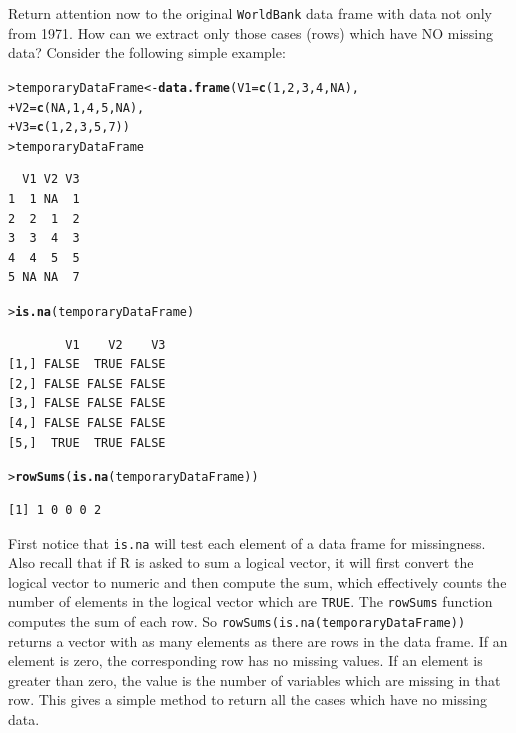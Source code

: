 \documentclass[12pt,oneside]{book}\usepackage[]{graphicx}\usepackage[]{color}
\makeatletter
\newcommand{\hlnum}[1]{\textcolor[rgb]{0.686,0.059,0.569}{#1}}%
\newcommand{\hlstd}[1]{\textcolor[rgb]{0.345,0.345,0.345}{#1}}%
\newcommand{\hlkwb}[1]{\textcolor[rgb]{0.69,0.353,0.396}{#1}}%
\newcommand{\hlkwc}[1]{\textcolor[rgb]{0.333,0.667,0.333}{#1}}%
\newcommand{\hlkwd}[1]{\textcolor[rgb]{0.737,0.353,0.396}{\textbf{#1}}}%
\newenvironment{kframe}{%
 \def\at@end@of@kframe{}%
 \ifinner\ifhmode%
  \def\at@end@of@kframe{\end{minipage}}%
  \begin{minipage}{\columnwidth}%
 \fi\fi%
 \def\FrameCommand##1{\hskip\@totalleftmargin \hskip-\fboxsep
 \colorbox{shadecolor}{##1}\hskip-\fboxsep
     \hskip-\linewidth \hskip-\@totalleftmargin \hskip\columnwidth}%
 \MakeFramed {\advance\hsize-\width
   \@totalleftmargin\z@ \linewidth\hsize
   \@setminipage}}%
 {\par\unskip\endMakeFramed%
 \at@end@of@kframe}
\newenvironment{knitrout}{}{} %
\makeatother
\begin{document}
Return attention now to the original \verb+WorldBank+ data frame with data not only from 1971. How can we extract only those cases (rows) which have NO missing data?  Consider the following simple example:
\begin{knitrout}
\color{fgcolor}\begin{kframe}
\begin{alltt}
\hlstd{> }\hlstd{temporaryDataFrame} \hlkwb{<-} \hlkwd{data.frame}\hlstd{(}\hlkwc{V1} \hlstd{=} \hlkwd{c}\hlstd{(}\hlnum{1}\hlstd{,} \hlnum{2}\hlstd{,} \hlnum{3}\hlstd{,} \hlnum{4}\hlstd{,} \hlnum{NA}\hlstd{),}
\hlstd{+ }                                 \hlkwc{V2} \hlstd{=} \hlkwd{c}\hlstd{(}\hlnum{NA}\hlstd{,} \hlnum{1}\hlstd{,} \hlnum{4}\hlstd{,} \hlnum{5}\hlstd{,} \hlnum{NA}\hlstd{),}
\hlstd{+ }                                 \hlkwc{V3} \hlstd{=} \hlkwd{c}\hlstd{(}\hlnum{1}\hlstd{,} \hlnum{2}\hlstd{,} \hlnum{3}\hlstd{,} \hlnum{5}\hlstd{,} \hlnum{7}\hlstd{))}
\hlstd{> }\hlstd{temporaryDataFrame}
\end{alltt}
\begin{verbatim}
  V1 V2 V3
1  1 NA  1
2  2  1  2
3  3  4  3
4  4  5  5
5 NA NA  7
\end{verbatim}
\begin{alltt}
\hlstd{> }\hlkwd{is.na}\hlstd{(temporaryDataFrame)}
\end{alltt}
\begin{verbatim}
        V1    V2    V3
[1,] FALSE  TRUE FALSE
[2,] FALSE FALSE FALSE
[3,] FALSE FALSE FALSE
[4,] FALSE FALSE FALSE
[5,]  TRUE  TRUE FALSE
\end{verbatim}
\begin{alltt}
\hlstd{> }\hlkwd{rowSums}\hlstd{(}\hlkwd{is.na}\hlstd{(temporaryDataFrame))}
\end{alltt}
\begin{verbatim}
[1] 1 0 0 0 2
\end{verbatim}
\end{kframe}
\end{knitrout}
First notice that \verb+is.na+ will test each element of a data frame for missingness. Also recall that if R is asked to sum a logical vector, it will first convert the logical vector to numeric and then compute the sum, which effectively counts the number of elements in the logical vector which are \verb+TRUE+. The \verb+rowSums+ function computes the sum of each row. So \verb+rowSums(is.na(temporaryDataFrame))+ returns a vector with as many elements as there are rows in the data frame. If an element is zero, the corresponding row has no missing values. If an element is greater than zero, the value is the number of variables which are missing in that row. This gives a simple method to return all the cases which have no missing data.
\end{document}
